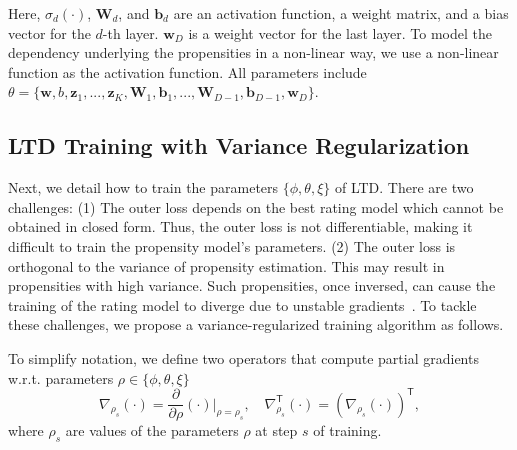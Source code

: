 \documentclass[letterpaper]{article} %
\newcommand{\transpose}{\mathsf{T}}
\newcommand{\matrixize}[1]{\mathbf{#1}}
\newcommand{\vectorize}[1]{\bm{#1}}
\newcommand{\nFeature}{K}
\newcommand{\lgBias}{b}
\newcommand{\lgWeight}{\vectorize{w}}
\newcommand{\nLayer}{D}
\newcommand{\iLayer}{d}
\newcommand{\npLinearBias}{\lgBias}
\newcommand{\npLinearWeight}{\lgWeight}
\newcommand{\npDeepBias}{\vectorize{b}}
\newcommand{\npDeepWeight}{\matrixize{W}}
\newcommand{\npLastLayer}{\vectorize{w}_\nLayer}
\newcommand{\npEmbedding}{\vectorize{z}}
\newcommand{\ratingParam}{\phi}
\newcommand{\errorParam}{\xi}%
\newcommand{\propensityParam}{\theta}
\newcommand{\parameters}{\rho}
\newcommand{\step}{s}
\begin{document}
Here, $\sigma_\iLayer(\cdot)$, $\npDeepWeight_\iLayer$, and $\npDeepBias_\iLayer$ are an activation function, a weight matrix, and a bias vector for the $\iLayer$-th layer.
$\npLastLayer$ is a weight vector for the last layer.
To model the dependency underlying the propensities in a non-linear way, we use a non-linear function as the activation function.
All parameters include $\propensityParam=\{\npLinearWeight,\npLinearBias,\npEmbedding_1,...,\npEmbedding_\nFeature,\npDeepWeight_1,\npDeepBias_1,...,\npDeepWeight_{\nLayer-1},\npDeepBias_{\nLayer-1},\npLastLayer\}$.

\subsection{LTD Training with Variance Regularization}
\label{sec:ltd training}
Next, we detail how to train the parameters $\{\ratingParam,\propensityParam,\errorParam\}$ of LTD.
There are two challenges: 
(1) The outer loss depends on the best rating model which cannot be obtained in closed form.
Thus, the outer loss is not differentiable, making it difficult to train the propensity model's parameters.
(2) The outer loss is orthogonal to the variance of propensity estimation.
This may result in propensities with high variance.
Such propensities, once inversed, can cause the training of the rating model to diverge due to unstable gradients~\cite{swaminathan2015self}.
To tackle these challenges, we propose a variance-regularized training algorithm as follows.

To simplify notation, we define two operators that compute partial gradients w.r.t. parameters $\parameters\in\{\ratingParam,\propensityParam,\errorParam\}$
\begin{equation*}
\nabla_{\parameters_\step}(\cdot)
=\frac{\partial}{\partial\parameters}(\cdot)
\Big|_{\parameters=\parameters_\step},
\quad
\nabla_{\parameters_\step}^\transpose(\cdot)
=(\nabla_{\parameters_\step}(\cdot))^\transpose,
\end{equation*}%
where $\parameters_\step$ are values of the parameters $\parameters$ at step $\step$ of training.
\end{document}
